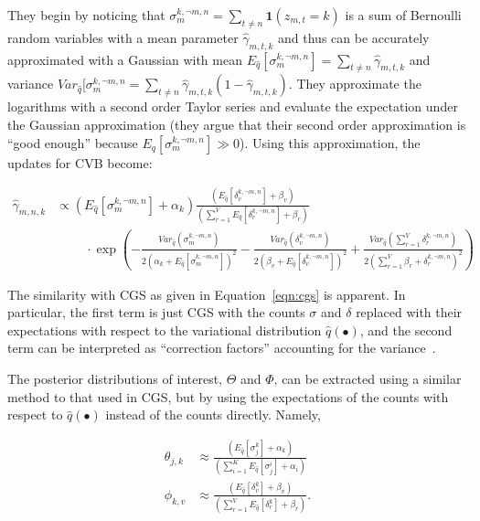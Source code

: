 \documentclass[11pt]{article}
\begin{document}
They begin by noticing that $\sigma_m^{k,\neg m,n} = \sum_{t \neq n}
\mathbf{1}(z_{m,t} = k)$ is a sum of Bernoulli random variables with a mean
parameter $\hat{\gamma}_{m,t,k}$ and thus can be accurately approximated
with a Gaussian with mean $E_{\hat{q}}[\sigma_m^{k,\neg m,n}] = \sum_{t\neq n}
\hat{\gamma}_{m,t,k}$ and variance $Var_{\hat{q}}[\sigma_m^{k,\neg m,n} =
\sum_{t\neq n} \hat{\gamma}_{m,t,k}(1-\hat{\gamma}_{m,t,k})$. They
approximate the logarithms with a second order Taylor series and evaluate
the expectation under the Gaussian approximation (they argue that their
second order approximation is ``good enough'' because
$E_{\hat{q}}[\sigma_m^{k,\neg m,n}] \gg 0$). Using this approximation, the
updates for CVB become:

\begin{align}
  \hat{\gamma}_{m,n,k} &\propto
  \left(E_{\hat{q}}[\sigma_m^{k,\neg m,n}] + \alpha_k\right)
  \frac{\left(E_{\hat{q}}[\delta_v^{k,\neg m,n}] + \beta_v\right)}
  {\left(\sum_{r=1}^V E_{\hat{q}}[\delta_r^{k,\neg m,n}] +
  \beta_r\right)}\nonumber\\
  &\quad\quad\;
  \cdot\exp\left(
    -\frac{Var_{\hat{q}}(\sigma_m^{k,\neg m,n})}
    {2(\alpha_k + E_{\hat{q}}[\sigma_m^{k,\neg m,n}])^2}
    -\frac{Var_{\hat{q}}(\delta_v^{k,\neg m,n})}
    {2(\beta_v + E_{\hat{q}}[\delta_v^{k,\neg m,n}])^2}
    +\frac{Var_{\hat{q}}(\sum_{r=1}^V \delta_r^{k,\neg m,n})}
    {2(\sum_{r=1}^V \beta_r + \delta_r^{k,\neg m,n})^2}
  \right)
  \label{eqn:cvb}
\end{align}

The similarity with CGS as given in Equation~\ref{eqn:cgs} is apparent. In
particular, the first term is just CGS with the counts $\sigma$ and
$\delta$ replaced with their expectations with respect to the variational
distribution $\hat{q}(\bullet)$, and the second term can be interpreted as
``correction factors'' accounting for the variance~\cite{Teh:2007:CVB}.

The posterior distributions of interest, $\Theta$ and $\Phi$, can be
extracted using a similar method to that used in CGS, but by using the
expectations of the counts with respect to $\hat{q}(\bullet)$ instead of
the counts directly. Namely,

\begin{align}
  \theta_{j,k}
  &\approx
  \frac{(E_{\hat{q}}[\sigma_j^k] + \alpha_k)}
  {\left(\sum_{i=1}^K E_{\hat{q}}[\sigma_j^i] + \alpha_i\right)}\\
  \phi_{k,v}
  &\approx
  \frac{(E_{\hat{q}}[\delta_v^k] + \beta_v)}
  {\left(\sum_{r=1}^V E_{\hat{q}}[\delta_r^k] + \beta_r\right)}.
\end{align}
\end{document}
